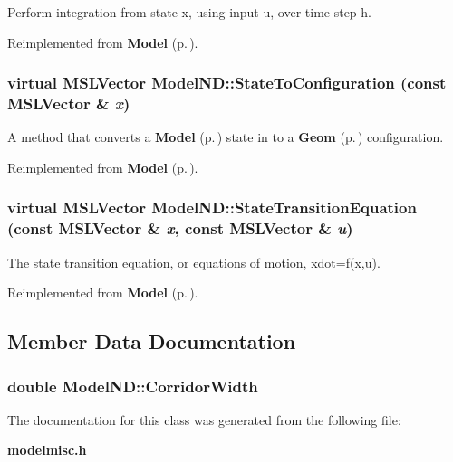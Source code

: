 Perform integration from state x, using input u, over time step h.



Reimplemented from {\bf Model} {\rm (p.\,\pageref{class_Model_a5})}.
\subsubsection{\setlength{\rightskip}{0pt plus 5cm}virtual {\bf MSLVector} Model\-ND::State\-To\-Configuration (const {\bf MSLVector} \& {\em x})\hspace{0.3cm}{\tt  [virtual]}}\label{class_ModelND_a2}


A method that converts a {\bf Model} {\rm (p.\,\pageref{class_Model})} state in to a {\bf Geom} {\rm (p.\,\pageref{class_Geom})} configuration.



Reimplemented from {\bf Model} {\rm (p.\,\pageref{class_Model_a8})}.
\subsubsection{\setlength{\rightskip}{0pt plus 5cm}virtual {\bf MSLVector} Model\-ND::State\-Transition\-Equation (const {\bf MSLVector} \& {\em x}, const {\bf MSLVector} \& {\em u})\hspace{0.3cm}{\tt  [virtual]}}\label{class_ModelND_a4}


The state transition equation, or equations of motion, xdot=f(x,u).



Reimplemented from {\bf Model} {\rm (p.\,\pageref{class_Model_a3})}.

\subsection{Member Data Documentation}
\subsubsection{\setlength{\rightskip}{0pt plus 5cm}double Model\-ND::Corridor\-Width}\label{class_ModelND_m0}




The documentation for this class was generated from the following file:\begin{CompactItemize}
\item 
{\bf modelmisc.h}\end{CompactItemize}
